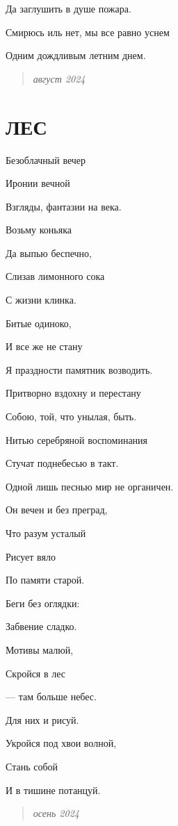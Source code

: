 \documentclass[
  a5paperpaper,
  DIV=11,
  numbers=noendperiod]{scrreprt}
\begin{document}
Да заглушить в душе пожара.

Смирюсь иль нет, мы все равно уснем

Одним дождливым летним днем.

\begin{quote}
\emph{август 2024}
\end{quote}

\section{ЛЕС}\label{ux43bux435ux441}

Безоблачный вечер

Иронии вечной

Взгляды, фантазии на века.

Возьму коньяка

Да выпью беспечно,

Слизав лимонного сока

С жизни клинка.

Битые одиноко,

И все же не стану

Я праздности памятник возводить.

Притворно вздохну и перестану

Собою, той, что унылая, быть.

Нитью серебряной воспоминания

Стучат поднебесью в такт.

Одной лишь песнью мир не органичен.

Он вечен и без преград,

Что разум усталый

Рисует вяло

По памяти старой.

Беги без оглядки:

Забвение сладко.

Мотивы малюй,

Скройся в лес

--- там больше небес.

Для них и рисуй.

Укройся под хвои волной,

Стань собой

И в тишине потанцуй.

\begin{quote}
\emph{осень 2024}
\end{quote}

\section{}\label{section-20}
\end{document}
